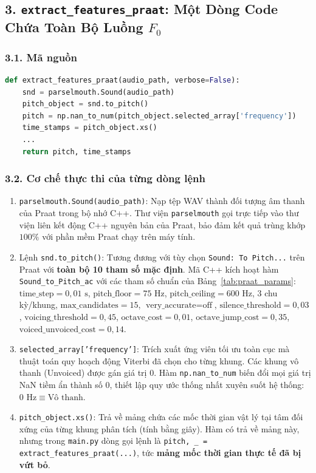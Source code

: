 \documentclass[11pt,a4paper]{article}
\begin{document}
\subsection*{3. \texttt{extract\_features\_praat}: Một Dòng Code Chứa Toàn Bộ Luồng $F_0$}

\subsubsection*{3.1. Mã nguồn}
\begin{lstlisting}[language=Python]
def extract_features_praat(audio_path, verbose=False):
    snd = parselmouth.Sound(audio_path)
    pitch_object = snd.to_pitch()
    pitch = np.nan_to_num(pitch_object.selected_array['frequency'])
    time_stamps = pitch_object.xs()
    ...
    return pitch, time_stamps
\end{lstlisting}

\subsubsection*{3.2. Cơ chế thực thi của từng dòng lệnh}
\begin{enumerate}
    \setlength{\itemsep}{1.5pt}
    \item \texttt{parselmouth.Sound(audio\_path)}: Nạp tệp WAV thành đối tượng âm thanh của Praat trong bộ nhớ C++. Thư viện \texttt{parselmouth} gọi trực tiếp vào thư viện liên kết động C++ nguyên bản của Praat, bảo đảm kết quả trùng khớp $100\%$ với phần mềm Praat chạy trên máy tính.
    \item Lệnh \texttt{snd.to\_pitch()}: Tương đương với tùy chọn \texttt{Sound: To Pitch...} trên Praat với \textbf{toàn bộ 10 tham số mặc định}. Mã C++ kích hoạt hàm \texttt{Sound\_to\_Pitch\_ac} với các tham số chuẩn của Bảng~\ref{tab:praat_params}: $\text{time\_step} = 0{,}01\text{ s}$, $\text{pitch\_floor} = 75\text{ Hz}$, $\text{pitch\_ceiling} = 600\text{ Hz}$, 3 chu kỳ/khung, $\text{max\_candidates} = 15$, $\text{very\_accurate} = \text{off}$, $\text{silence\_threshold} = 0{,}03$, $\text{voicing\_threshold} = 0{,}45$, $\text{octave\_cost} = 0{,}01$, $\text{octave\_jump\_cost} = 0{,}35$, $\text{voiced\_unvoiced\_cost} = 0{,}14$.
    \item \texttt{selected\_array['frequency']}: Trích xuất ứng viên tối ưu toàn cục mà thuật toán quy hoạch động Viterbi đã chọn cho từng khung. Các khung vô thanh (Unvoiced) được gán giá trị $0$. Hàm \texttt{np.nan\_to\_num} biến đổi mọi giá trị NaN tiềm ẩn thành số $0$, thiết lập quy ước thống nhất xuyên suốt hệ thống: \textbf{$0\text{ Hz} \equiv \text{Vô thanh}$}.
    \item \texttt{pitch\_object.xs()}: Trả về mảng chứa các mốc thời gian vật lý tại tâm đối xứng của từng khung phân tích (tính bằng giây). Hàm có trả về mảng này, nhưng trong \texttt{main.py} dòng gọi lệnh là \texttt{pitch, \_ = extract\_features\_praat(...)}, tức \textbf{mảng mốc thời gian thực tế đã bị vứt bỏ}.
\end{enumerate}
\end{document}
